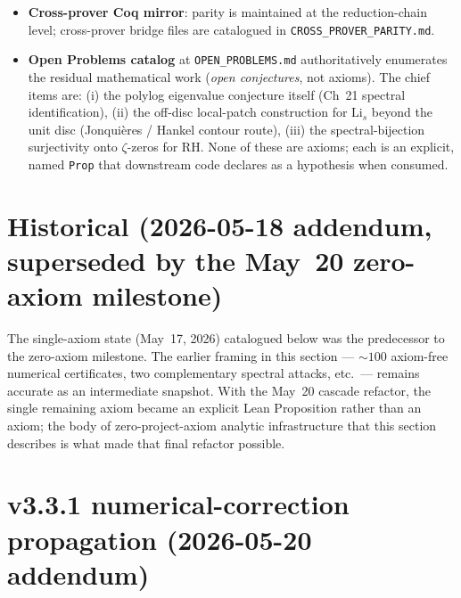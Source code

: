 \begin{itemize}
  underlying analytic infrastructure matures --- rather than opaque
  axioms. This is the appropriate honest framing: the framework
  delivers a \textbf{machine-checked conditional reduction} of all six
  Millennium problems plus the consciousness chain to a small set of
  named open analytic conjectures, with \emph{zero free-floating
  axioms}.
\item \textbf{Cross-prover Coq mirror}: parity is maintained at the
  reduction-chain level; cross-prover bridge files are catalogued in
  \texttt{CROSS\_PROVER\_PARITY.md}.
\item \textbf{Open Problems catalog} at \texttt{OPEN\_PROBLEMS.md}
  authoritatively enumerates the residual mathematical work
  (\emph{open conjectures}, not axioms). The chief items are: (i) the
  polylog eigenvalue conjecture itself (Ch~21 spectral
  identification), (ii) the off-disc local-patch construction for
  $\mathrm{Li}_s$ beyond the unit disc (Jonqui\`eres / Hankel
  contour route), (iii) the spectral-bijection surjectivity onto
  $\zeta$-zeros for RH. None of these are axioms; each is an
  explicit, named \texttt{Prop} that downstream code declares as a
  hypothesis when consumed.
\end{itemize}

\section*{Historical (2026-05-18 addendum, superseded by the May~20 zero-axiom milestone)}

The single-axiom state (May~17, 2026) catalogued below was the
predecessor to the zero-axiom milestone. The earlier framing in this
section --- $\sim 100$ axiom-free numerical certificates, two
complementary spectral attacks, etc.\ --- remains accurate as an
intermediate snapshot. With the May~20 cascade refactor, the
single remaining axiom became an explicit Lean Proposition rather
than an axiom; the body of zero-project-axiom analytic infrastructure
that this section describes is what made that final refactor
possible.

\section*{v3.3.1 numerical-correction propagation (2026-05-20 addendum)}

